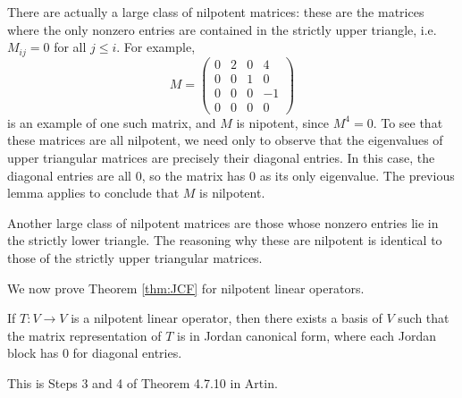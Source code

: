 There are actually a large class of nilpotent matrices: these are
the matrices where the only nonzero entries are contained in the 
strictly upper triangle, i.e. $M_{ij} = 0$ for all $j \leq i$. 
For example,
\[
M = \left(
\begin{matrix}
0 & 2 & 0 & 4\\
0 & 0 & 1 & 0\\
0 & 0 & 0 & -1\\
0 & 0 & 0 & 0
\end{matrix}
\right)
\]
is an example of one such matrix, and $M$ is nipotent, since $M^4 
= 0$. To see that these matrices are all
nilpotent, we need only to observe that the eigenvalues of upper 
triangular matrices are precisely their diagonal entries. In this
case, the diagonal entries are all $0$, so the matrix has $0$ as
its only eigenvalue. The previous lemma applies to conclude that
$M$ is nilpotent.

Another large class of nilpotent matrices are those whose nonzero 
entries lie in the strictly lower triangle. The reasoning why
these are nilpotent is identical to those of the strictly upper 
triangular matrices.

We now prove Theorem \ref{thm:JCF} for nilpotent linear operators.

\begin{thm}\label{thm:nilpotent_JCF}
If $T: V \to V$ is a nilpotent linear operator, then there exists a 
basis of $V$ such that the matrix representation of $T$ is in Jordan
canonical form, where each Jordan block has $0$ for diagonal entries.
\end{thm}

This is Steps 3 and 4 of Theorem 4.7.10 in Artin.

